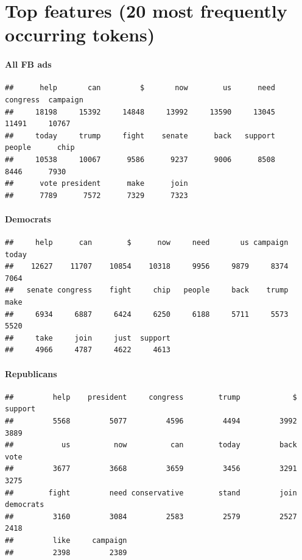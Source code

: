 \documentclass[
  12pt,
]{article}
\begin{document}
\pagebreak

\hypertarget{top-features-20-most-frequently-occurring-tokens}{%
\section{Top features (20 most frequently occurring tokens)}\label{top-features-20-most-frequently-occurring-tokens}}

\hypertarget{all-fb-ads}{%
\paragraph{All FB ads}\label{all-fb-ads}}

\begin{verbatim}
##      help       can         $       now        us      need  congress  campaign 
##     18198     15392     14848     13992     13590     13045     11491     10767 
##     today     trump     fight    senate      back   support    people      chip 
##     10538     10067      9586      9237      9006      8508      8446      7930 
##      vote president      make      join 
##      7789      7572      7329      7323
\end{verbatim}

\hypertarget{democrats}{%
\paragraph{Democrats}\label{democrats}}

\begin{verbatim}
##     help      can        $      now     need       us campaign    today 
##    12627    11707    10854    10318     9956     9879     8374     7064 
##   senate congress    fight     chip   people     back    trump     make 
##     6934     6887     6424     6250     6188     5711     5573     5520 
##     take     join     just  support 
##     4966     4787     4622     4613
\end{verbatim}

\hypertarget{republicans}{%
\paragraph{Republicans}\label{republicans}}

\begin{verbatim}
##         help    president     congress        trump            $      support 
##         5568         5077         4596         4494         3992         3889 
##           us          now          can        today         back         vote 
##         3677         3668         3659         3456         3291         3275 
##        fight         need conservative        stand         join    democrats 
##         3160         3084         2583         2579         2527         2418 
##         like     campaign 
##         2398         2389
\end{verbatim}
\end{document}
